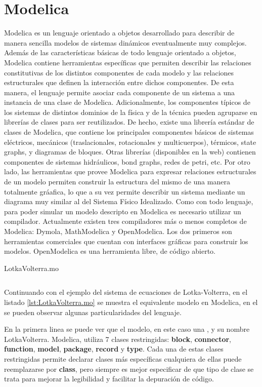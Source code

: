 \section{Modelica}

	Modelica es un lenguaje orientado a objetos desarrollado para describir de manera sencilla modelos de sistemas dinámicos eventualmente muy complejos.
	Además de las características básicas de todo lenguaje orientado a objetos, Modelica contiene herramientas específicas que permiten describir las relaciones
	constitutivas de los distintos componentes de cada modelo y las relaciones estructurales que definen la interacción entre dichos componentes.
	De esta manera, el lenguaje permite asociar cada componente de un sistema a una instancia de una clase de Modelica.
	Adicionalmente, los componentes típicos de los sistemas de distintos dominios de la física y de la técnica pueden agruparse en librerías de clases para ser
	reutilizados. De hecho, existe una librería estándar de clases de Modelica, que contiene los principales componentes básicos de sistemas eléctricos,
	mecánicos (traslacionales, rotacionales y multicuerpos), térmicos, state graphs, y diagramas de bloques. 
	Otras librerías (disponibles en la web) contienen componentes de sistemas hidráulicos, bond graphs, redes de petri, etc.
	Por otro lado, las herramientas que provee Modelica para expresar relaciones estructurales de un modelo permiten construir la estructura del mismo de una
	manera totalmente gráafica, lo que a su vez permite describir un sistema mediante un diagrama muy similar al del Sistema Físico Idealizado.
	Como con todo lenguaje, para poder simular un modelo descripto en Modelica es necesario utilizar un compilador. Actualmente existen tres compiladores
	más o menos completos de Modelica: Dymola, MathModelica y OpenModelica. Los dos primeros son herramientas comerciales que cuentan con interfaces
	gráficas para construir los modelos. OpenModelica es una herramienta libre, de código abierto.

\begin{listing}[H]    
	\caption{LotkaVolterra.mo}
	\inputminted[linenos]{modelica}{src/LotkaVolterra.mo}
	\label{lst:LotkaVolterra.mo}
\end{listing} 
	
	Continuando con el ejemplo del sistema de ecuaciones de Lotka-Volterra, en el listado \ref{lst:LotkaVolterra.mo} se muestra el equivalente modelo en Modelica, 
	en el se pueden observar algunas particularidades del lenguaje.
	
	En la primera linea se puede ver que el modelo, en este caso una , y su nombre LotkaVolterra.
	Modelica, utiliza 7 clases restringidas:
	\textbf{block}, \textbf{connector}, \textbf{function}, \textbf{model}, \textbf{package}, \textbf{record} y \textbf{type}.
	Cada una de estas clases restringidas permite declarar clases más específicas cualquiera de ellas puede reemplazarse
	por \textbf{class}, pero siempre es mejor especificar de que tipo de clase se trata para mejorar la legibilidad y facilitar la depuración de código.

